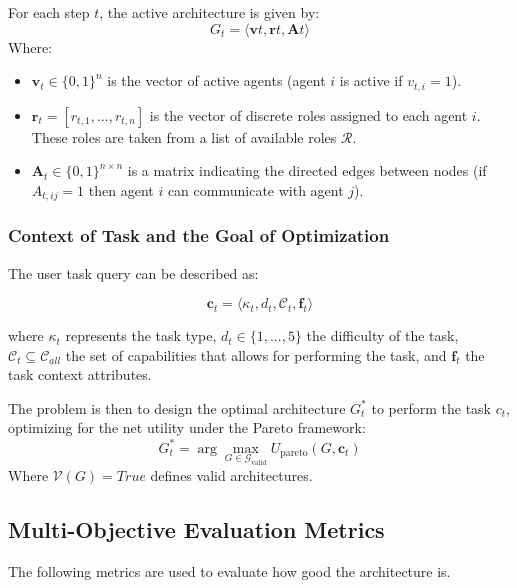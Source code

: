 \documentclass[conference]{IEEEtran}
\begin{document}
For each step $t$, the active architecture is given by:
\begin{equation}
G_t = \langle \mathbf{v}t, \mathbf{r}t, \mathbf{A}t \rangle
\end{equation}
Where:
\begin{itemize}[leftmargin=*]
\item $\mathbf{v}_t \in \{0, 1\}^n$ is the vector of active agents (agent $i$ is active if $v_{t,i} = 1$).
\item $\mathbf{r}_t = [r_{t,1}, ..., r_{t,n}]$ is the vector of discrete roles assigned to each agent $i$. These roles are taken from a list of available roles $\mathcal{R}$.
\item $\mathbf{A}_t \in \{0, 1\}^{n \times n}$ is a matrix indicating the directed edges between nodes (if $A_{t,ij} = 1$ then agent $i$ can communicate with agent $j$).
\end{itemize}

\subsubsection{Context of Task and the Goal of Optimization}

The user task query can be described as:

\begin{equation}
\mathbf{c}_t = \langle \kappa_t, d_t, \mathcal{C}_t, \mathbf{f}_t \rangle
\label{eq:context}
\end{equation}

where $\kappa_t$ represents the task type, $d_t \in \{1,..., 5\}$ the difficulty of the task, $\mathcal{C}_t \subseteq \mathcal{C}_{all}$ the set of capabilities that allows for performing the task, and $\mathbf{f}_t$ the task context attributes.

The problem is then to design the optimal architecture $G_t^*$ to perform the task $c_t$, optimizing for the net utility under the Pareto framework:
\begin{equation}
G_t^* = \arg\max_{G \in \mathcal{G}_{\mathrm{valid}}}
U_{\mathrm{pareto}}(G, \mathbf{c}_t)
\label{eq:optimization}
\end{equation}
Where $\mathcal{V}(G) = True$ defines valid architectures.

\subsection{Multi-Objective Evaluation Metrics}
The following metrics are used to evaluate how good the architecture is.
\end{document}
